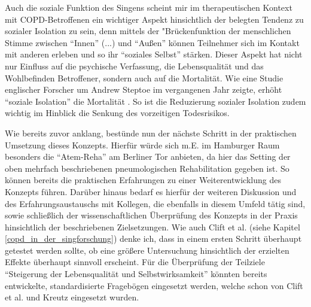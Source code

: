 Auch die soziale Funktion des Singens scheint mir im therapeutischen Kontext mit COPD-Betroffenen ein wichtiger Aspekt hinsichtlich der belegten Tendenz zu sozialer Isolation zu sein, denn mittels der "Brückenfunktion der menschlichen Stimme zwischen "`Innen"' (...) und "`Außen"' \autocite[283]{deckervoigt2000} können Teilnehmer sich im Kontakt mit anderen erleben und so ihr "`soziales Selbst"' stärken. Dieser Aspekt hat nicht nur Einfluss auf die psychische Verfassung, die Lebensqualität und das Wohlbefinden Betroffener, sondern auch auf die Mortalität. Wie eine Studie englischer Forscher um Andrew Steptoe im vergangenen Jahr zeigte, erhöht "`soziale Isolation"' die Mortalität \autocite[vgl.][]{pmid23530191}. So ist die Reduzierung sozialer Isolation zudem wichtig im Hinblick die Senkung des vorzeitigen Todesrisikos.


Wie bereits zuvor anklang, bestünde nun der nächste Schritt in der praktischen Umsetzung dieses Konzepts. Hierfür würde sich m.E. im Hamburger Raum besonders die "`Atem-Reha"' am Berliner Tor anbieten, da hier das Setting der oben mehrfach beschriebenen pneumologischen Rehabilitation gegeben ist. So können bereits die praktischen Erfahrungen zu einer Weiterentwicklung des Konzepts führen. Darüber hinaus bedarf es hierfür der weiteren Diskussion und des Erfahrungsaustauschs mit Kollegen, die ebenfalls in diesem Umfeld tätig sind, sowie schließlich der wissenschaftlichen Überprüfung des Konzepts in der Praxis hinsichtlich der beschriebenen Zielsetzungen. Wie auch Clift et al. (siehe Kapitel \ref{copd_in_der_singforschung}) denke ich, dass in einem ersten Schritt überhaupt getestet werden sollte, ob eine größere Untersuchung hinsichtlich der erzielten Effekte überhaupt sinnvoll erscheint. Für die Überprüfung der Teilziele "`Steigerung der Lebensqualität und Selbstwirksamkeit"' könnten bereits entwickelte, standardisierte Fragebögen eingesetzt werden, welche schon von Clift et al. und Kreutz eingesetzt wurden.


